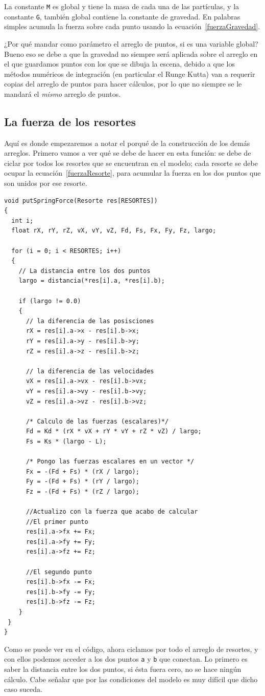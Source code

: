 La constante \verb|M| es global y tiene la masa de cada una de las partículas, y la constante \verb|G|, también global contiene la constante de gravedad.
En palabras simples acumula la fuerza sobre cada punto usando la ecuación~\ref{fuerzaGravedad}.

¿Por qué mandar como parámetro el arreglo de puntos, si es una variable global? Bueno eso se debe a que la gravedad no siempre será aplicada sobre el arreglo en el que guardamos puntos con los que se dibuja la escena, debido a que los métodos numéricos de integración (en particular el Runge Kutta) van a requerir copias del arreglo de puntos para hacer cálculos, por lo que no siempre se le mandará el \emph{mismo} arreglo de puntos.

\subsection{La fuerza de los resortes}
Aquí es donde empezaremos a notar el porqué de la construcción de los demás arreglos.
Primero vamos a ver qué se debe de hacer en esta función: se debe de ciclar por todos los resortes que se encuentran en el modelo; cada resorte se debe ocupar la ecuación~\ref{fuerzaResorte}, para acumular la fuerza en los dos puntos que son unidos por ese resorte.
\begin{verbatim}
void putSpringForce(Resorte res[RESORTES])
{
  int i;
  float rX, rY, rZ, vX, vY, vZ, Fd, Fs, Fx, Fy, Fz, largo;

  for (i = 0; i < RESORTES; i++)
  {
    // La distancia entre los dos puntos
    largo = distancia(*res[i].a, *res[i].b);

    if (largo != 0.0)
    {
      // la diferencia de las posisciones
      rX = res[i].a->x - res[i].b->x;
      rY = res[i].a->y - res[i].b->y;
      rZ = res[i].a->z - res[i].b->z;

      // la diferencia de las velocidades
      vX = res[i].a->vx - res[i].b->vx;
      vY = res[i].a->vy - res[i].b->vy;
      vZ = res[i].a->vz - res[i].b->vz;

      /* Calculo de las fuerzas (escalares)*/
      Fd = Kd * (rX * vX + rY * vY + rZ * vZ) / largo;
      Fs = Ks * (largo - L);

      /* Pongo las fuerzas escalares en un vector */
      Fx = -(Fd + Fs) * (rX / largo);
      Fy = -(Fd + Fs) * (rY / largo);
      Fz = -(Fd + Fs) * (rZ / largo);

      //Actualizo con la fuerza que acabo de calcular
      //El primer punto
      res[i].a->fx += Fx;
      res[i].a->fy += Fy;
      res[i].a->fz += Fz;

      //El segundo punto
      res[i].b->fx -= Fx;
      res[i].b->fy -= Fy;
      res[i].b->fz -= Fz;
    }
 }
}
\end{verbatim} 
Como se puede ver en el código, ahora ciclamos por todo el arreglo de resortes, y con ellos podemos acceder a los dos puntos \verb|a| y \verb|b| que conectan.
Lo primero es saber la distancia entre los dos puntos, si ésta fuera cero, no se hace ningún cálculo.
Cabe señalar que por las condiciones del modelo es muy difícil que dicho caso suceda.

